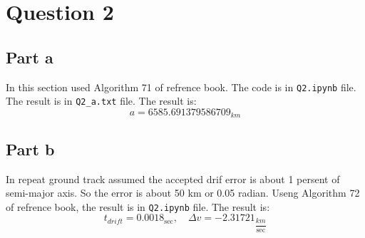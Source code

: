 \section{Question 2}
\subsection{Part a}
In this section used Algorithm 71 of refrence book. The code is in \texttt{Q2.ipynb} file. The result is in \texttt{Q2\_a.txt} file. The result is:
$$
a = 6585.691379586709_{km}
$$

\subsection{Part b}
In repeat ground track assumed the accepted drif error is about 1 persent of semi-major axis. So the error is about 50 km or 0.05 radian. Useng Algorithm 72 of refrence book, the result is in \texttt{Q2.ipynb} file. The result is:
$$
t_{drift} = 0.0018_{\sec}, \quad \Delta v = -2.31721_{\dfrac{km}{\sec}}
$$